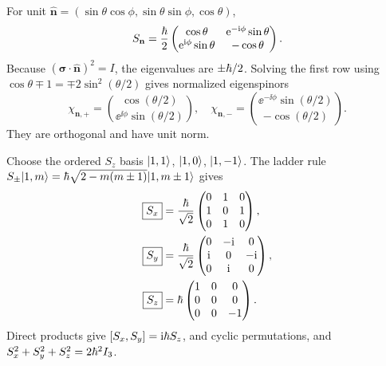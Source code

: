 For unit $\hat{\mathbf n}=
(\sin\theta\cos\phi,\sin\theta\sin\phi,\cos\theta)$,
\begin{equation}
S_{\mathbf n}=\frac{\hbar}2
\begin{pmatrix}
\cos\theta&\mathrm e^{-\mathrm i\phi}\sin\theta\\
\mathrm e^{\mathrm i\phi}\sin\theta&-\cos\theta
\end{pmatrix}.
\end{equation}
Because $(\boldsymbol\sigma\cdot\hat{\mathbf n})^2=I$,
the eigenvalues are $\pm\hbar/2$.
Solving the first row using
$\cos\theta\mp1=\mp2\sin^2(\theta/2)$
gives normalized eigenspinors
\begin{equation}
\boxed{\chi_{\mathbf n,+}=
\binom{\cos(\theta/2)}
{\ee^{\ii\phi}\sin(\theta/2)}},
\quad
\boxed{\chi_{\mathbf n,-}=
\binom{\ee^{-\ii\phi}\sin(\theta/2)}
{-\cos(\theta/2)}}.
\end{equation}
They are orthogonal and have unit norm.

Choose the ordered $S_z$ basis
$\lvert 1,1\rangle$, $\lvert 1,0\rangle$, $\lvert 1,-1\rangle$.
The ladder rule
$S_\pm\lvert 1,m\rangle=\hbar
\sqrt{2-m(m\pm1)}\lvert 1,m\pm1\rangle$
gives
\begin{align}
\boxed{S_x}&=\frac{\hbar}{\sqrt2}
\begin{pmatrix}0&1&0\\1&0&1\\0&1&0\end{pmatrix},\\
\boxed{S_y}&=\frac{\hbar}{\sqrt2}
\begin{pmatrix}0&-\mathrm i&0\\\mathrm i&0&-\mathrm i\\0&\mathrm i&0\end{pmatrix},\\
\boxed{S_z}&=\hbar\begin{pmatrix}
1&0&0\\0&0&0\\0&0&-1
\end{pmatrix}.
\end{align}
Direct products give
$[S_x,S_y]=\mathrm i\hbar S_z$,
and cyclic permutations, and
$S_x^2+S_y^2+S_z^2=2\hbar^2I_3$.
